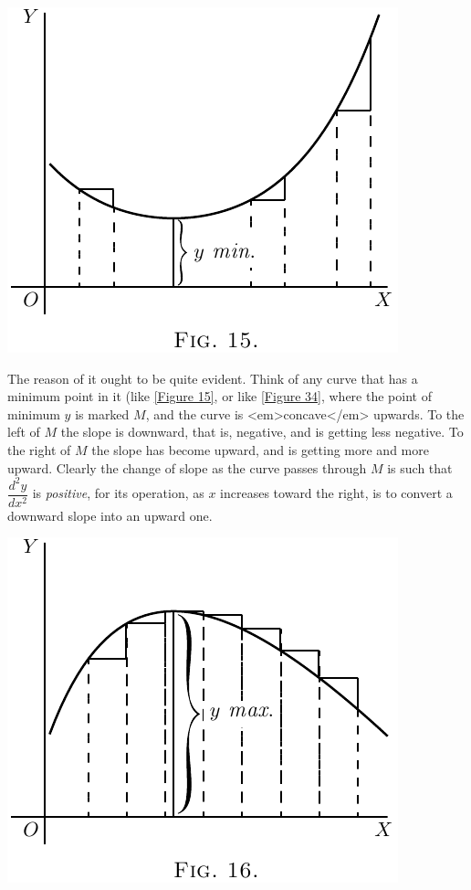 \documentclass{ximera}
\begin{document}
\begin{image}
\label{Figure15}
\includegraphics{093b.png}
\end{image}


The reason of it ought to be quite evident. Think
of any curve that has a minimum point in it (like
\ref{Figure 15}, or like \ref{Figure 34}, where the point of
minimum $y$ is marked $M$, and the curve is <em>concave</em>
upwards. To the left of $M$ the slope is downward,
that is, negative, and is getting less negative. To the
right of $M$ the slope has become upward, and is
getting more and more upward. Clearly the change
of slope as the curve passes through $M$ is such that
$\dfrac{d^2y}{dx^2}$ is \textit{positive}, for its operation, as $x$ increases toward
the right, is to convert a downward slope into an
upward one.

\begin{image}
\label{Figure16}
\includegraphics{094a.png}
\end{image}
\end{document}
